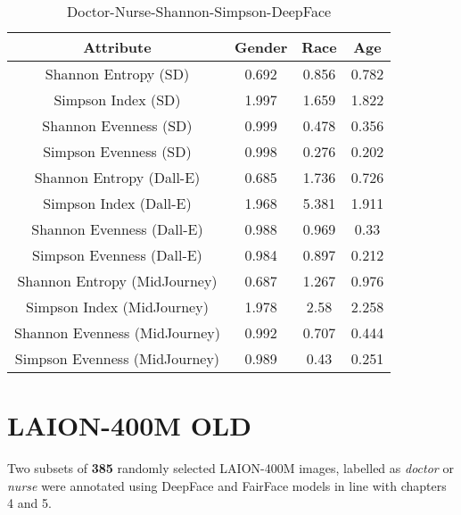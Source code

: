 \begin{table}[h]
\centering
\begin{tabular}{|c|c|c|c|}
\hline 
Attribute & Gender & Race & Age\\
\hline
Shannon Entropy (SD) & 0.692  &  0.856  &  0.782 \\
Simpson Index (SD) & 1.997  &  1.659  &  1.822 \\
Shannon Evenness (SD) & 0.999  &  0.478  &  0.356 \\
Simpson Evenness (SD) & 0.998  &  0.276  &  0.202 \\
\hline 
Shannon Entropy (Dall-E) & 0.685  &  1.736  &  0.726 \\
Simpson Index (Dall-E) & 1.968  &  5.381  &  1.911 \\
Shannon Evenness (Dall-E) & 0.988  &  0.969  &  0.33 \\
Simpson Evenness (Dall-E) & 0.984  &  0.897  &  0.212 \\
\hline 
Shannon Entropy (MidJourney) & 0.687  &  1.267  &  0.976 \\
Simpson Index (MidJourney) & 1.978  &  2.58  &  2.258 \\
Shannon Evenness (MidJourney) & 0.992  &  0.707  &  0.444 \\
Simpson Evenness (MidJourney) & 0.989  &  0.43  &  0.251 \\
\hline
\end{tabular}
\caption{Doctor-Nurse-Shannon-Simpson-DeepFace}
\label{tab:doctor-nurse-shannon-simpson-deepFace}
\end{table}


\section{LAION-400M OLD}
Two subsets of \textbf{385} randomly selected LAION-400M images, labelled as \textit{doctor} or \textit{nurse} were annotated using DeepFace and FairFace models in line with chapters 4 and 5. 

